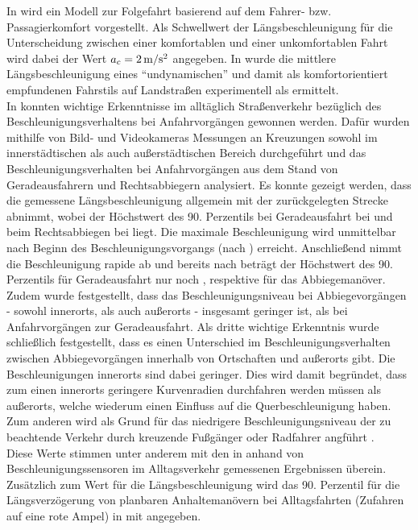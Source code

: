 In \cite{liu und wu} wird ein Modell zur Folgefahrt basierend auf dem Fahrer- bzw. Passagierkomfort vorgestellt. Als Schwellwert der Längsbeschleunigung für die Unterscheidung zwischen einer komfortablen und einer unkomfortablen Fahrt wird dabei der Wert $a_c = 2\,\mathrm{m/s^2}$ angegeben. In \cite{radke} wurde die mittlere Längsbeschleunigung eines ``undynamischen'' und damit als komfortorientiert empfundenen Fahrstils auf Landstraßen experimentell als  ermittelt. \\
In \cite{krause} konnten wichtige Erkenntnisse im alltäglich Straßenverkehr bezüglich des Beschleunigungsverhaltens bei Anfahrvorgängen gewonnen werden. Dafür wurden mithilfe von Bild- und Videokameras Messungen an Kreuzungen sowohl im innerstädtischen als auch außerstädtischen Bereich durchgeführt und das Beschleunigungsverhalten bei Anfahrvorgängen aus dem Stand von Geradeausfahrern und Rechtsabbiegern analysiert. Es konnte gezeigt werden, dass die gemessene Längsbeschleunigung allgemein mit der zurückgelegten Strecke abnimmt, wobei der Höchstwert des 90. Perzentils bei Geradeausfahrt bei  und beim Rechtsabbiegen bei  liegt. Die maximale Beschleunigung wird unmittelbar nach Beginn des Beschleunigungsvorgangs (nach ) erreicht. Anschließend nimmt die Beschleunigung rapide ab und bereits nach  beträgt der Höchstwert des 90. Perzentils für Geradeausfahrt nur noch , respektive  für das Abbiegemanöver. Zudem wurde festgestellt, dass das Beschleunigungsniveau bei Abbiegevorgängen - sowohl innerorts, als auch außerorts - insgesamt geringer ist, als bei Anfahrvorgängen zur Geradeausfahrt. Als dritte wichtige Erkenntnis wurde schließlich festgestellt, dass es einen Unterschied im Beschleunigungsverhalten zwischen Abbiegevorgängen innerhalb von Ortschaften und außerorts gibt. Die Beschleunigungen innerorts sind dabei geringer. Dies wird damit begründet, dass zum einen innerorts geringere Kurvenradien durchfahren werden müssen als außerorts, welche wiederum einen Einfluss auf die Querbeschleunigung haben. Zum anderen wird als Grund für das niedrigere Beschleunigungsniveau der zu beachtende Verkehr durch kreuzende Fußgänger oder Radfahrer angführt \cite{krause}. \\
Diese Werte stimmen unter anderem mit den in \cite{hugemann, nickel} anhand von Beschleunigungssensoren im Alltagsverkehr gemessenen Ergebnissen überein. Zusätzlich zum Wert für die Längsbeschleunigung wird das 90. Perzentil für die Längsverzögerung von planbaren Anhaltemanövern bei Alltagsfahrten (Zufahren auf eine rote Ampel) in \cite{hugemann, nickel} mit  angegeben. 
